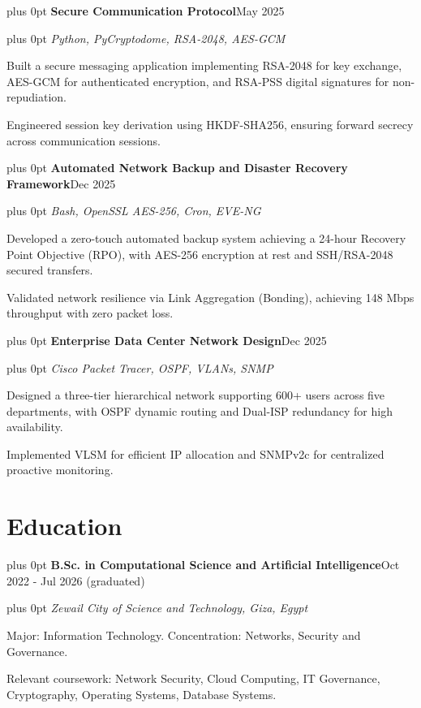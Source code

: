 \documentclass[10pt,letterpaper]{article}
\newcommand{\headerrow}[2]{%
  \begingroup\rightskip=0pt plus 0pt\relax
  #1\hfill #2\par\endgroup}
\newcommand{\entry}[4]{%
  \headerrow{\textbf{#1}}{#2}%
  \headerrow{\textit{#3}}{\textit{#4}}%
  \vspace{0.1em}}
\begin{document}
\entry{Secure Communication Protocol}{May 2025}
      {Python, PyCryptodome, RSA-2048, AES-GCM}{}
\begin{tight}
  \item Built a secure messaging application implementing RSA-2048 for key exchange, AES-GCM for authenticated encryption, and RSA-PSS digital signatures for non-repudiation.
  \item Engineered session key derivation using HKDF-SHA256, ensuring forward secrecy across communication sessions.
\end{tight}
\vspace{0.22em}

\entry{Automated Network Backup and Disaster Recovery Framework}{Dec 2025}
      {Bash, OpenSSL AES-256, Cron, EVE-NG}{}
\begin{tight}
  \item Developed a zero-touch automated backup system achieving a 24-hour Recovery Point Objective (RPO), with AES-256 encryption at rest and SSH/RSA-2048 secured transfers.
  \item Validated network resilience via Link Aggregation (Bonding), achieving 148 Mbps throughput with zero packet loss.
\end{tight}
\vspace{0.22em}

\entry{Enterprise Data Center Network Design}{Dec 2025}
      {Cisco Packet Tracer, OSPF, VLANs, SNMP}{}
\begin{tight}
  \item Designed a three-tier hierarchical network supporting 600+ users across five departments, with OSPF dynamic routing and Dual-ISP redundancy for high availability.
  \item Implemented VLSM for efficient IP allocation and SNMPv2c for centralized proactive monitoring.
\end{tight}

\section*{Education}

\entry{B.Sc. in Computational Science and Artificial Intelligence}{Oct 2022 - Jul 2026 (graduated)}
      {Zewail City of Science and Technology, Giza, Egypt}{}
\begin{tight}
  \item Major: Information Technology. Concentration: Networks, Security and Governance.
  \item Relevant coursework: Network Security, Cloud Computing, IT Governance, Cryptography, Operating Systems, Database Systems.
\end{tight}
\end{document}
